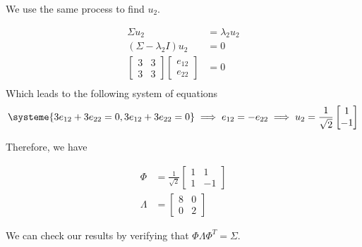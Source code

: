 \documentclass[a4paper, 12pt, twoside]{article}
\begin{document}
\begin{enumerate}[a)]
    We use the same process to find $u_2$.

    \begin{align*}
        \Sigma u_2 &= \lambda_2 u_2 \\
        (\Sigma - \lambda_2 I) u_2 &= 0 \\
        \begin{bmatrix}
            3 & 3 \\
            3 & 3
        \end{bmatrix}
        \begin{bmatrix}
            e_{12} \\ e_{22}
        \end{bmatrix} &= 0 \\
    \end{align*}
    Which leads to the following system of equations
    \begin{align*}
        \systeme{
            3 e_{12} + 3 e_{22} = 0, 
            3 e_{12} + 3 e_{22} = 0
        } 
        \implies e_{12} = - e_{22} 
    \implies u_2 = \frac{1}{\sqrt{2}}\begin{bmatrix}1 \\ -1\end{bmatrix}
    \end{align*}

    Therefore, we have

    \begin{align*}
        \Phi &= \frac{1}{\sqrt{2}}\begin{bmatrix}1&1\\1&-1\end{bmatrix} \\
        \Lambda &= \begin{bmatrix}8&0\\0&2\end{bmatrix}
    \end{align*}

    We can check our results by verifying that $\Phi \Lambda \Phi^T = \Sigma$.


\end{enumerate}
\end{document}
